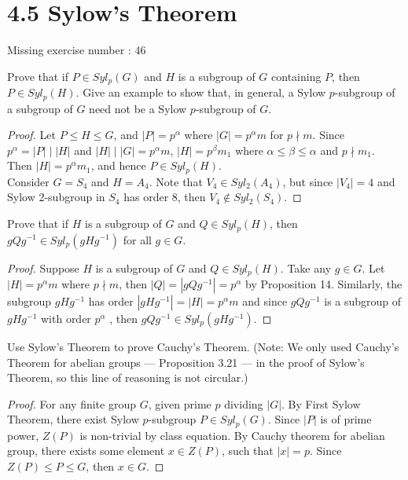 \documentclass{article}
\newenvironment{problem}[2][Problem]{\begin{trivlist}
\item[\hskip \labelsep {\bfseries #1}\hskip \labelsep {\bfseries #2.}]}{\end{trivlist}}
\begin{document}
\section*{4.5 Sylow's Theorem}
Missing exercise number : 46
\begin{problem}{1}
    Prove that if $P \in Syl_p(G)$ and $H$ is a subgroup of $G$ containing $P$, then $P \in Syl_p(H)$.  
   Give an example to show that, in general, a Sylow $p$-subgroup of a subgroup of $G$ need not be a Sylow $p$-subgroup of $G$.
\end{problem}
\begin{proof}
    Let $P\leq H \leq G$, and $|P|=p^{\alpha}$ where $|G|=p^{\alpha}m$ for $p \nmid m $. Since $p^\alpha = |P|\mid |H|$ and $|H|\mid |G| =p^{\alpha}m$,
    $|H|=p^{\beta}m_1$ where $\alpha\leq \beta \leq \alpha$ and $p\nmid m_1$. Then $|H|=p^{\alpha}m_1$, and hence $P\in Syl_p(H)$. \\
    Consider $G=S_4$ and $H=A_4$. Note that $V_4\in Syl_2(A_4)$, but since $|V_4|=4$ and Sylow 2-subgroup in $S_4$ has order $8$, then $V_4 \notin Syl_2(S_4)$.
\end{proof}
\begin{problem}{2}
Prove that if $H$ is a subgroup of $G$ and $Q \in Syl_p(H)$, then $gQ g^{-1} \in Syl_p(gHg^{-1})$ for all $g \in G$.
\end{problem}
\begin{proof}
    Suppose $H$ is a subgroup of $G$ and $Q \in Syl_p(H)$. Take any $g\in G$. Let $|H|=p^{\alpha}m$ where $p \nmid m$, then $|Q|=|gQg^{-1}|=p^{\alpha}$ by Proposition 14. Similarly, the subgroup $gHg^{-1}$ has order $|gHg^{-1}|=|H|=p^{\alpha}m$ and  since $gQg^{-1}$ is a subgroup of $gHg^{-1}$ with order $p^{\alpha}$ , then $gQg^{-1}\in Syl_p(gHg^{-1})$.
\end{proof}
\begin{problem}{3}
    Use Sylow's Theorem to prove Cauchy's Theorem.  
   (Note: We only used Cauchy's Theorem for abelian groups --- Proposition 3.21 --- in the proof of Sylow's Theorem, so this line of reasoning is not circular.)
\end{problem}
\begin{proof}
    For any finite group $G$, given prime  $p$ dividing $|G|$. By First Sylow Theorem, there exist Sylow $p$-subgroup $P\in Syl_p(G)$. Since $|P|$ is of prime power, $Z(P)$ is non-trivial by class equation. By Cauchy theorem for abelian group, there exists some element $x \in Z(P)$, such that $|x|=p$. Since $Z(P)\leq P\leq G$, then $x \in G$.
\end{proof}
\end{document}
